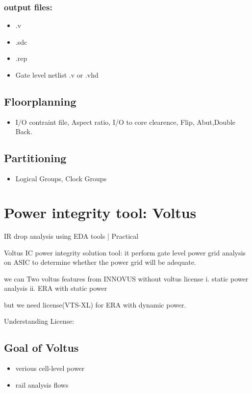 \documentclass[a4paper]{article}
\begin{document}
\subsubsection{output files:}
\label{sec:orga2cb524}
\begin{itemize}
\item .v
\item .sdc
\item .rep
\item Gate level netlist .v or .vhd
\end{itemize}

\subsection{Floorplanning}
\label{sec:orgda88dcd}
\begin{itemize}
\item I/O contraint file, Aspect ratio, I/O to core clearence, Flip, Abut,Double Back.
\end{itemize}

\subsection{Partitioning}
\label{sec:org4c8a7d6}
\begin{itemize}
\item Logical Groups, Clock Groups
\end{itemize}







\section{Power integrity tool: Voltus}
\label{sec:org844e314}

IR drop analysis using EDA tools | Practical

Voltus IC power integrity solution tool: it perform gate level power grid analysis
on ASIC to determine whether the power grid will be adequate.

we can Two voltus features from INNOVUS without voltus license
i. static power analysis
ii. ERA with static power

but we need license(VTS-XL) for ERA with dynamic power.

Understanding License:

\subsection{Goal of Voltus}
\label{sec:org43a9ecf}
\begin{itemize}
\item verious cell-level power
\item rail analysis flows
\end{itemize}
\end{document}
